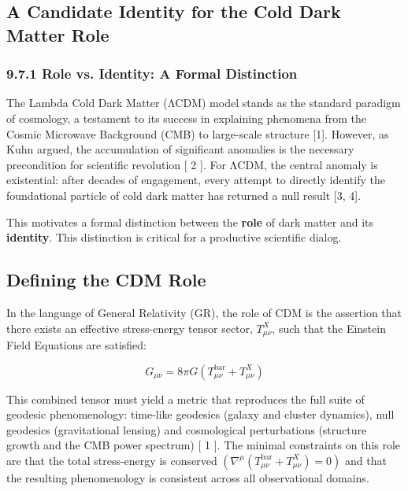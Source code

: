 \documentclass[11pt]{article}
\begin{document}
\subsection{A Candidate Identity for the Cold Dark Matter Role}\label{a-candidate-identity-for-the-cold-dark-matter-role}

\subsubsection{9.7.1 Role vs. Identity: A Formal Distinction}\label{role-vs.-identity-a-formal-distinction}

The Lambda Cold Dark Matter (ΛCDM) model stands as the standard paradigm of cosmology, a testament to its success in explaining phenomena from the Cosmic Microwave Background (CMB) to large-scale structure {[}1{]}. However, as Kuhn argued, the accumulation of significant anomalies is the necessary precondition for scientific revolution {[} 2 {]}. For ΛCDM, the central anomaly is existential: after decades of engagement, every attempt to directly identify the foundational particle of cold dark matter has returned a null result {[}3, 4{]}.

This motivates a formal distinction between the \textbf{role} of dark matter and its \textbf{identity}. This distinction is critical for a productive scientific dialog.

\subsection{Defining the CDM Role}\label{defining-the-cdm-role}

In the language of General Relativity (GR), the role of CDM is the assertion that there exists an effective stress-energy tensor sector, \(T_{\mu\nu}^{X}\), such that the Einstein Field Equations are satisfied:

\[G_{\mu\nu} = 8\pi G\left( T_{\mu\nu}^{\text{bar}} + T_{\mu\nu}^{X} \right)\]

This combined tensor must yield a metric that reproduces the full suite of geodesic phenomenology: time-like geodesics (galaxy and cluster dynamics), null geodesics (gravitational lensing) and cosmological perturbations (structure growth and the CMB power spectrum) {[} 1 {]}. The minimal constraints on this role are that the total stress-energy is conserved \(\left( \nabla^{\mu}\left( T_{\mu\nu}^{\text{bar}} + T_{\mu\nu}^{X} \right) = 0 \right)\) and that the resulting phenomenology is consistent across all observational domains.
\end{document}
